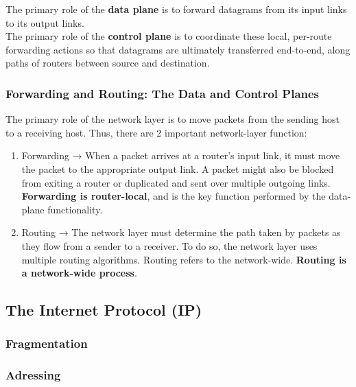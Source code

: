 \documentclass[12pt]{article}
\begin{document}
The primary role of the \textbf{data plane} is to forward datagrams from its input links to its output links. 
\vspace{0.5cm} \\
The primary role of the \textbf{control plane} is to coordinate these local, per-route forwarding actions so that datagrams are ultimately transferred end-to-end, along paths of routers between source and destination.

\subsubsection{Forwarding and Routing: The Data and Control Planes}

The primary role of the network layer is to move packets from the sending host to a receiving host. Thus, there are 2 important network-layer function:

\begin{enumerate}
    \item Forwarding → When a packet arrives at a router's input link, it must move the packet to the appropriate output link. A packet might also be blocked from exiting a router or duplicated and sent over multiple outgoing links. \\
    \textbf{Forwarding is router-local}, and is the key function performed by the data-plane functionality.
    \item Routing → The network layer must determine the path taken by packets as they flow from a sender to a receiver. To do so, the network layer uses multiple routing algorithms. Routing refers to the network-wide.
    \textbf{Routing is a network-wide process}.
\end{enumerate}

\subsection{}

\subsection{The Internet Protocol (IP)}

\subsubsection{Fragmentation}

\subsubsection{Adressing}
\end{document}
